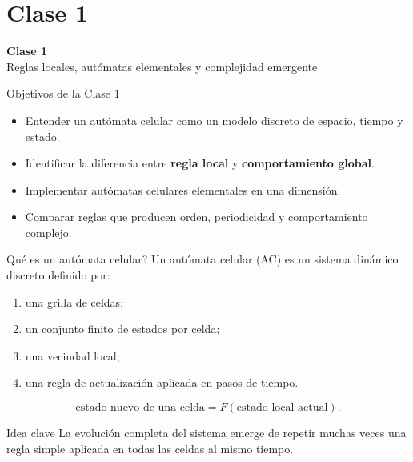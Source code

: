 \section{Clase 1}

\begin{frame}[plain]
\centering
\vfill
{\Huge \bfseries Clase 1}\\[0.4cm]
{\Large Reglas locales, autómatas elementales y complejidad emergente}
\vfill
\end{frame}

\begin{frame}{Objetivos de la Clase 1}
\begin{itemize}
    \item Entender un autómata celular como un modelo discreto de espacio, tiempo y estado.
    \item Identificar la diferencia entre \textbf{regla local} y \textbf{comportamiento global}.
    \item Implementar autómatas celulares elementales en una dimensión.
    \item Comparar reglas que producen orden, periodicidad y comportamiento complejo.
\end{itemize}
\end{frame}

\begin{frame}{\texorpdfstring{\textquestiondown Qué es un autómata celular?}{¿Qué es un autómata celular?}}
\justifying
Un autómata celular (AC) es un sistema dinámico discreto definido por:
\begin{enumerate}
    \item una grilla de celdas;
    \item un conjunto finito de estados por celda;
    \item una vecindad local;
    \item una regla de actualización aplicada en pasos de tiempo.
\end{enumerate}

\begin{equation*}
\text{estado nuevo de una celda} = F(\text{estado local actual}).
\end{equation*}

\begin{alertblock}{Idea clave}
La evolución completa del sistema emerge de repetir muchas veces una regla simple aplicada en todas las celdas al mismo tiempo.
\end{alertblock}
\end{frame}

